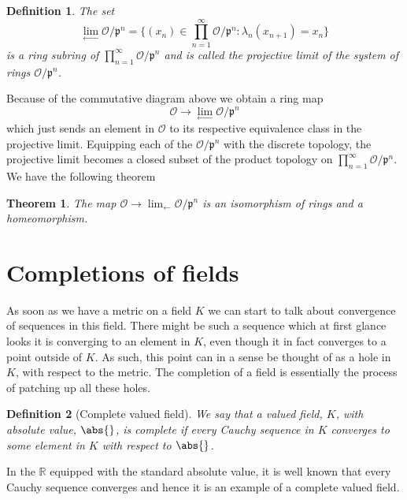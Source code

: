 \documentclass{article}
\newtheorem{theorem}{Theorem}[section]
\newtheorem{definition}{Definition}[section]
\newcommand{\mfrak}[1]{\mathfrak{#1}}
\newcommand{\mcal}[1]{\mathcal{#1}}
\newcommand{\mbb}[1]{\mathbb{#1}}
\begin{document}
\begin{definition}
    The set
    $$\lim_{\leftarrow} \mcal O / \mfrak p^n = \{ (x_n) \in \prod_{n=1}^\infty \mcal O / \mfrak p^n : \lambda_n(x_{n+1}) = x_n \}$$
    is a ring subring of $\prod_{n=1}^\infty \mcal O / \mfrak p^n$ and is called the projective limit of the system of rings $\mcal O / \mfrak p^n$.
\end{definition}

Because of the commutative diagram above we obtain a ring map 
$$\mcal O \to \lim_{\leftarrow} \mcal O / \mfrak p^n$$
which just sends an element in $\mcal O$ to its respective equivalence class in the projective limit. Equipping each of the $\mcal O / \mfrak p^n$ with the discrete topology, the projective limit becomes a closed subset of the product topology on $\prod_{n=1}^\infty \mcal O / \mfrak p^n$. We have the following theorem

\begin{theorem}
    The map $\mcal O \to \lim_{\leftarrow} \mcal O / \mfrak p^n$ is an isomorphism of rings and a homeomorphism.
\end{theorem}


\section{Completions of fields}
As soon as we have a metric on a field $K$ we can start to talk about convergence of sequences in this field. There might be such a sequence which at first glance looks it is converging to an element in $K$, even though it in fact converges to a point outside of $K$. As such, this point can in a sense be thought of as a hole in $K$, with respect to the metric. The completion of a field is essentially the process of patching up all these holes. 



\begin{definition}[Complete valued field]
    We say that a valued field, $K$, with absolute value, $\abs{}$, is complete if every Cauchy sequence in $K$ converges to some element in $K$ with respect to $\abs{}$.
\end{definition}

In the $\mbb R$ equipped with the standard absolute value, it is well known that every Cauchy sequence converges and hence it is an example of a complete valued field.  
\end{document}
